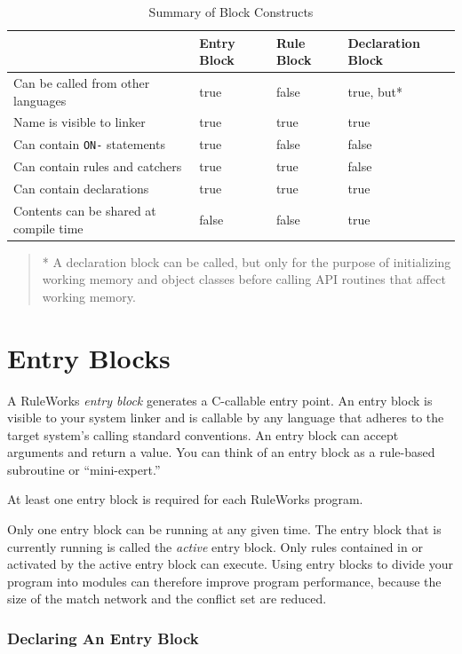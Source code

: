 \begin{table}[h]
  \begin{tabularx}{\columnwidth}{Xlll}
    \toprule
    & Entry Block & Rule Block & Declaration Block \\
    \midrule
    Can be called from other languages & true & false & true, but* \\
    Name is visible to linker & true & true & true \\
    Can contain \verb|ON-| statements & true & false & false \\
    Can contain rules and catchers & true & true & false \\
    Can contain declarations & true & true & true \\
    Contents can be shared at compile time & false & false & true \\
    \bottomrule
  \end{tabularx}
  \begin{quote}
    * A declaration block can be called, but only for the purpose of
    initializing working memory and object classes before calling API
    routines that affect working memory.
  \end{quote}
  \caption{Summary of Block Constructs}
  \label{t:5-1}
\end{table}

\section{Entry Blocks}

A RuleWorks \emph{entry block} generates a C-callable entry point. An
entry block is visible to your system linker and is callable by any
language that adheres to the target system's calling standard
conventions. An entry block can accept arguments and return a
value. You can think of an entry block as a rule-based subroutine or
``mini-expert.''

At least one entry block is required for each RuleWorks program.

Only one entry block can be running at any given time. The entry block
that is currently running is called the \emph{active} entry
block. Only rules contained in or activated by the active entry block
can execute. Using entry blocks to divide your program into modules
can therefore improve program performance, because the size of the
match network and the conflict set are reduced.

\subsubsection{Declaring An Entry Block}

